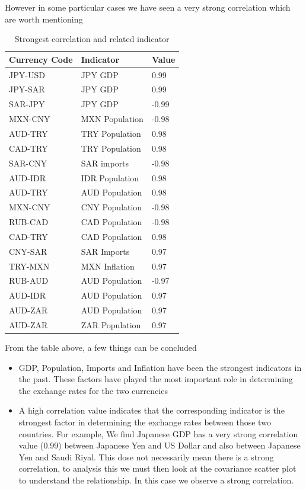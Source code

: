 However in some particular cases we have seen a very strong correlation which are worth mentioning
\begin{table}[!h]
\centering
\caption{Strongest correlation and related indicator}
\label{my-label}
\begin{tabular}{|l|l|l|}
\hline
Currency Code  & Indicator       & Value \\ \hline
JPY-USD        & JPY GDP         & 0.99  \\ \hline
JPY-SAR        & JPY GDP         & 0.99  \\ \hline
SAR-JPY        & JPY GDP         & -0.99 \\ \hline
MXN-CNY        & MXN Population  & -0.98 \\ \hline
AUD-TRY        & TRY Population  & 0.98  \\ \hline
CAD-TRY        & TRY Population  & 0.98  \\ \hline
SAR-CNY        & SAR imports     & -0.98 \\ \hline
AUD-IDR        & IDR Population  & 0.98  \\ \hline
AUD-TRY        & AUD Population  & 0.98  \\ \hline
MXN-CNY        & CNY Population  & -0.98 \\ \hline
RUB-CAD        & CAD Population  & -0.98 \\ \hline
CAD-TRY        & CAD Population  & 0.98  \\ \hline
CNY-SAR        & SAR Imports     & 0.97  \\ \hline
TRY-MXN        & MXN Inflation   & 0.97  \\ \hline
RUB-AUD        & AUD Population  & -0.97 \\ \hline
AUD-IDR        & AUD Population  & 0.97  \\ \hline
AUD-ZAR        & AUD Population  & 0.97  \\ \hline
AUD-ZAR        & ZAR Population & 0.97  \\ \hline
\end{tabular}
\end{table}

From the table above, a few things can be concluded

\begin{itemize}
\item GDP, Population, Imports and Inflation have been the strongest indicators in the past\cite{edwards2006relationship}. These factors have played the most important role in determining the exchange rates for the two currencies
\item A high correlation value indicates that the corresponding indicator is the strongest factor in determining the exchange rates between those two countries\cite{burstein2005large}. For example, We find Japanese GDP has a very strong correlation value (0.99) between Japanese Yen and US Dollar and also between Japanese Yen and Saudi Riyal.  This dose not necessarily mean there is a strong correlation, to analysis this we must then look at the covariance scatter plot to understand the relationship. In this case we observe a strong correlation.
\end{itemize}
